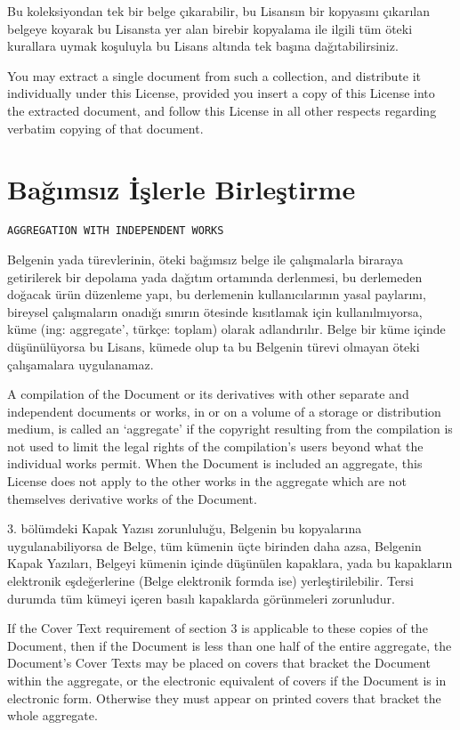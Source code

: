 \begin{multicols}{2}
Bu koleksiyondan tek bir belge çıkarabilir, bu Lisansın bir kopyasını çıkarılan belgeye koyarak bu Lisansta yer alan birebir kopyalama ile ilgili tüm öteki kurallara uymak koşuluyla %
bu Lisans altında tek başına dağıtabilirsiniz.
\begin{ingliz}You may extract a single document from such a collection,
and distribute it individually under this License, provided
you insert a copy of this License into the extracted document,
and follow this License in all other respects regarding
verbatim copying of that document.\end{ingliz}

\section{Bağımsız İşlerle Birleştirme}\hfill\begin{verbatim}AGGREGATION WITH INDEPENDENT WORKS\end{verbatim}\label{gfdl-7}

Belgenin yada türevlerinin, öteki bağımsız belge ile çalışmalarla biraraya getirilerek bir depolama yada dağıtım ortamında derlenmesi, bu derlemeden doğacak ürün düzenleme yapı, bu derlemenin kullanıcılarının yasal paylarını, bireysel çalışmaların onadığı sınırın ötesinde kısıtlamak için kullanılmıyorsa, küme (ing: aggregate', türkçe: toplam) %
olarak adlandırılır. Belge bir küme içinde düşünülüyorsa %
bu Lisans, kümede olup ta bu Belgenin türevi olmayan öteki çalışamalara uygulanamaz.
\begin{ingliz}A compilation of the Document or its derivatives with
other separate and independent documents or works, in or on a
volume of a storage or distribution medium, is called an
`aggregate' if the copyright resulting from the
compilation is not used to limit the legal rights of the
compilation's users beyond what the individual works
permit.  When the Document is included an aggregate, this
License does not apply to the other works in the aggregate
which are not themselves derivative works of the Document.\end{ingliz}

3. bölümdeki Kapak Yazısı zorunluluğu, Belgenin bu kopyalarına uygulanabiliyorsa de Belge, tüm kümenin üçte birinden daha azsa, Belgenin Kapak Yazıları, Belgeyi kümenin içinde düşünülen kapaklara, yada bu kapakların elektronik eşdeğerlerine (Belge elektronik formda ise) yerleştirilebilir. Tersi durumda %
tüm kümeyi içeren basılı kapaklarda görünmeleri zorunludur.
\begin{ingliz}If the Cover Text requirement of section 3 is applicable
to these copies of the Document, then if the Document is less
than one half of the entire aggregate, the Document's
Cover Texts may be placed on covers that bracket the Document
within the aggregate, or the electronic equivalent of covers
if the Document is in electronic form.  Otherwise they must
appear on printed covers that bracket the whole aggregate.
\end{ingliz}


\end{multicols}
